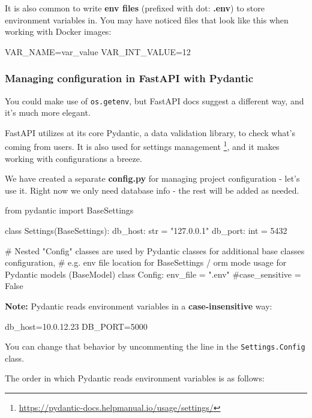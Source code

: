 \documentclass[14pt]{extarticle}
\newcommand{\flink}[1]{\footnote{\href{#1}{#1}}}
\newcommand{\note}{\textbf{\color{red}Note: }}
\newcommand{\pyinline}[1]{\lstinline[language=Python, style=cstyle, morekeywords={async}, basicstyle=\ttfamily\normalsize]{#1}}
\begin{document}
It is also common to write \textbf{env files} (prefixed with dot: \textbf{.env}) to store environment variables in. You may have noticed files that look like this when working with Docker images:

\begin{bashcode}
    VAR_NAME=var_value
    VAR_INT_VALUE=12
\end{bashcode}

\subsubsection{Managing configuration in FastAPI with Pydantic}

You could make use of \pyinline{os.getenv}, but FastAPI docs suggest a different way, and it's much more elegant.

FastAPI utilizes at its core Pydantic, a data validation library, to check what's coming from users. It is also used for settings management \flink{https://pydantic-docs.helpmanual.io/usage/settings/}, and it makes working with configurations a breeze.

We have created a separate \textbf{config.py} for managing project configuration - let's use it. Right now we only need database info - the rest will be added as needed.

\begin{pycode}
    from pydantic import BaseSettings


    class Settings(BaseSettings):
        db_host: str = "127.0.0.1"
        db_port: int = 5432

        # Nested "Config" classes are used by Pydantic classes for additional base classes configuration,
        # e.g. env file location for BaseSettings / orm mode usage for Pydantic models (BaseModel)
        class Config:
            env_file = ".env"
            #case_sensitive = False
\end{pycode}

\note Pydantic reads environment variables in a \textbf{case-insensitive} way:

\begin{bashcode}
    db_host=10.0.12.23
    DB_PORT=5000
\end{bashcode}

You can change that behavior by uncommenting the line in the \pyinline{Settings.Config} class.

The order in which Pydantic reads environment variables is as follows:
\end{document}
